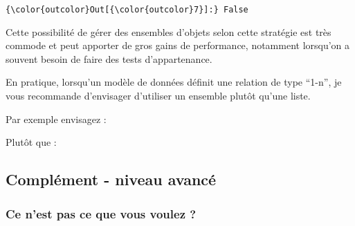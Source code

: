 \begin{Verbatim}[commandchars=\\\{\},frame=single,framerule=0.3mm,rulecolor=\color{cellframecolor}]
{\color{outcolor}Out[{\color{outcolor}7}]:} False
\end{Verbatim}
            
    Cette possibilité de gérer des ensembles d'objets selon cette stratégie
est très commode et peut apporter de gros gains de performance,
notamment lorsqu'on a souvent besoin de faire des tests d'appartenance.

En pratique, lorsqu'un modèle de données définit une relation de type
``1-n'', je vous recommande d'envisager d'utiliser un ensemble plutôt
qu'une liste.

    Par exemple envisagez :

\begin{Shaded}
\begin{Highlighting}[frame=lines,framerule=0.6mm,rulecolor=\color{asisframecolor}]

     \NormalTok{(}\NormalTok{):}
        \OperatorTok{=} \NormalTok{()}
\end{Highlighting}
\end{Shaded}

    Plutôt que :

\begin{Shaded}
\begin{Highlighting}[frame=lines,framerule=0.6mm,rulecolor=\color{asisframecolor}]

     \NormalTok{(}\NormalTok{):}
        \OperatorTok{=}\NormalTok{ []}
\end{Highlighting}
\end{Shaded}

    \hypertarget{compluxe9ment---niveau-avancuxe9}{%
\subsection{Complément - niveau
avancé}\label{compluxe9ment---niveau-avancuxe9}}

    \hypertarget{ce-nest-pas-ce-que-vous-voulez}{%
\subsubsection{Ce n'est pas ce que vous voulez
?}\label{ce-nest-pas-ce-que-vous-voulez}}

